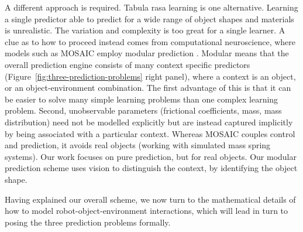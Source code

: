 A different approach is required. Tabula rasa learning is one alternative.  Learning a single predictor able to predict for a wide range of object shapes and materials is unrealistic. The variation and complexity is too great for a single learner. A clue as to how to proceed instead comes from computational neuroscience, where models such as MOSAIC employ modular prediction \cite{Haruno_MOSAIC_2008}. Modular means that the overall prediction engine consists of many context specific predictors (Figure~\ref{fig:three-prediction-problems} right panel), where a context is an object, or an object-environment combination. The first advantage of this is that it can be easier to solve many simple learning problems than one complex learning problem. Second, unobservable parameters (frictional coefficients, mass, mass distribution) need not be modelled explicitly but are instead captured implicitly by being associated with a particular context. Whereas MOSAIC couples control and prediction, it avoids real objects (working with simulated mass spring systems). Our work focuses on pure prediction, but for real objects. Our modular prediction scheme uses vision to distinguish the context, by identifying the object shape.

Having explained our overall scheme, we now turn to the mathematical details of how to model robot-object-environment interactions, which will lead in turn to posing the three prediction problems formally.
